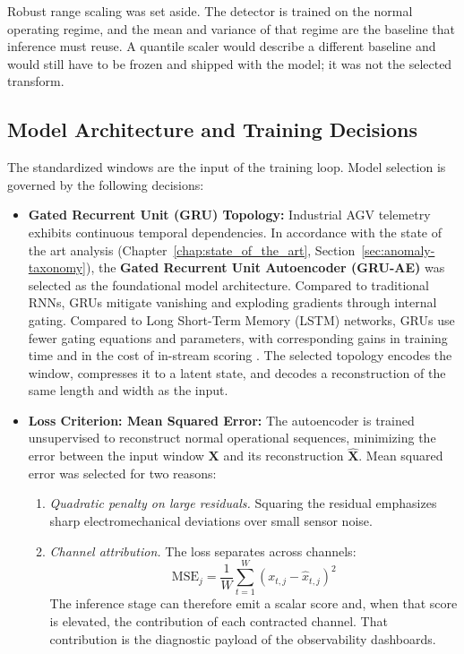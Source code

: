Robust range scaling was set aside. The detector is trained on the normal operating regime, and the mean and variance of that regime are the baseline that inference must reuse. A quantile scaler would describe a different baseline and would still have to be frozen and shipped with the model; it was not the selected transform.

\subsection{Model Architecture and Training Decisions}
\label{subsec:arch_ml_model}

The standardized windows are the input of the training loop. Model selection is governed by the following decisions:

\begin{itemize}
    \item \textbf{Gated Recurrent Unit (GRU) Topology:}
    Industrial AGV telemetry exhibits continuous temporal dependencies. In accordance with the state of the art analysis (Chapter~\ref{chap:state_of_the_art}, Section~\ref{sec:anomaly-taxonomy}), the \textbf{Gated Recurrent Unit Autoencoder (GRU-AE)} was selected as the foundational model architecture. Compared to traditional RNNs, GRUs mitigate vanishing and exploding gradients through internal gating. Compared to Long Short-Term Memory (LSTM) networks, GRUs use fewer gating equations and parameters, with corresponding gains in training time and in the cost of in-stream scoring \cite{dey2017gate}. The selected topology encodes the window, compresses it to a latent state, and decodes a reconstruction of the same length and width as the input.

    \item \textbf{Loss Criterion: Mean Squared Error:}
    The autoencoder is trained unsupervised to reconstruct normal operational sequences, minimizing the error between the input window $\mathbf{X}$ and its reconstruction $\hat{\mathbf{X}}$. Mean squared error was selected for two reasons:
    \begin{enumerate}
        \item \textit{Quadratic penalty on large residuals.} Squaring the residual emphasizes sharp electromechanical deviations over small sensor noise.
        \item \textit{Channel attribution.} The loss separates across channels:
        \begin{equation}
            \text{MSE}_j = \frac{1}{W} \sum_{t=1}^{W} \left( x_{t,j} - \hat{x}_{t,j} \right)^2
        \end{equation}
        The inference stage can therefore emit a scalar score and, when that score is elevated, the contribution of each contracted channel. That contribution is the diagnostic payload of the observability dashboards.
    \end{enumerate}


\end{itemize}
